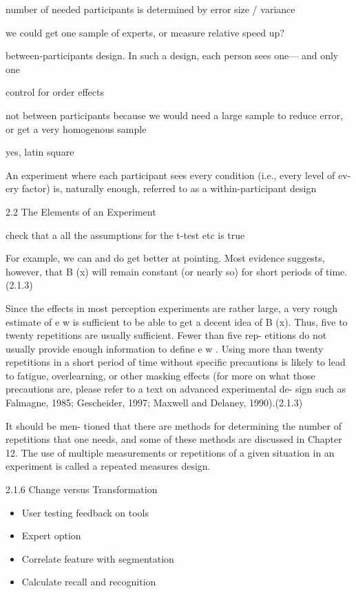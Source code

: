 number of needed participants is determined by error size / variance

we could get one sample of experts, or measure relative speed up?

between-participants design. In such a design, each person sees one—
and only one

control for order effects

not between participants because we would need a large sample to reduce error, or get a very homogenous sample

yes, latin square

An
experiment where each participant sees every condition (i.e., every level of ev-
ery factor) is, naturally enough, referred to as a within-participant design


2.2 The Elements of an Experiment

check that a all the assumptions for the t-test etc is true


For example, we can and do get better at pointing.
Most evidence suggests, however, that B (x) will remain constant (or nearly so) for short periods of time. (2.1.3)

Since the effects in most perception experiments are rather
large, a very rough estimate of e w is sufficient to be able to get a decent idea of
B (x). Thus, five to twenty repetitions are usually sufficient. Fewer than five rep-
etitions do not usually provide enough information to define e w . Using more
than twenty repetitions in a short period of time without specific precautions is likely to lead to fatigue, overlearning, or other masking effects (for more on
what those precautions are, please refer to a text on advanced experimental de-
sign such as Falmagne, 1985; Gescheider, 1997; Maxwell and Delaney, 1990).(2.1.3)

It should be men-
tioned that there are methods for determining the number of repetitions that
one needs, and some of these methods are discussed in Chapter 12. The use of
multiple measurements or repetitions of a given situation in an experiment is
called a repeated measures design.

2.1.6 Change versus Transformation

\begin{itemize}
\item User testing feedback on tools
\item Expert option

\item Correlate feature with segmentation
\item Calculate recall and recognition

\end{itemize}